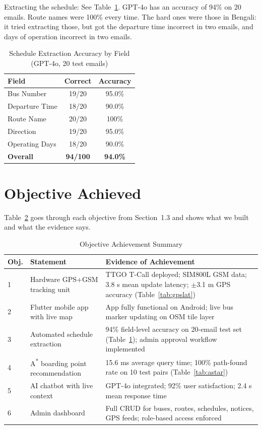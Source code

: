 \documentclass[12pt,a4paper]{report}
\begin{document}
Extracting the schedule: See Table~\ref{tab:extractacc}. GPT-4o has an accuracy of 94\% on 20 emails. Route names were 100\% every time. The hard ones were those in Bengali: it tried extracting those, but got the departure time incorrect in two emails, and days of operation incorrect in two emails.
\begin{table}[t]
\caption{Schedule Extraction Accuracy by Field (GPT-4o, 20 test emails)}
\label{tab:extractacc}
\centering
\begin{tabular}{lcc}
\toprule
\textbf{Field} & \textbf{Correct} & \textbf{Accuracy}\\
\midrule
Bus Number     & 19/20 & 95.0\% \\
Departure Time & 18/20 & 90.0\% \\
Route Name     & 20/20 & 100\%  \\
Direction      & 19/20 & 95.0\% \\
Operating Days & 18/20 & 90.0\% \\
\midrule
\textbf{Overall} & \textbf{94/100} & \textbf{94.0\%} \\
\bottomrule
\end{tabular}
\end{table}

\section{Objective Achieved}

Table~\ref{tab:objectives} goes through each objective from Section~1.3 and shows what we built and what the evidence says.

\begin{table}[t]
\caption{Objective Achievement Summary}
\label{tab:objectives}
\centering
\begin{tabularx}{\linewidth}{lXX}
\toprule
\textbf{Obj.} & \textbf{Statement} & \textbf{Evidence of Achievement}\\
\midrule
1 & Hardware GPS+GSM tracking unit & TTGO T-Call deployed; SIM800L GSM data; 3.8 s mean update latency; $\pm$3.1 m GPS accuracy (Table~\ref{tab:gpslat}) \\
2 & Flutter mobile app with live map & App fully functional on Android; live bus marker updating on OSM tile layer \\
3 & Automated schedule extraction & 94\% field-level accuracy on 20-email test set (Table~\ref{tab:extractacc}); admin approval workflow implemented \\
4 & A\textsuperscript{*} boarding point recommendation & 15.6 ms average query time; 100\% path-found rate on 10 test pairs (Table~\ref{tab:astar}) \\
5 & AI chatbot with live context & GPT-4o integrated; 92\% user satisfaction; 2.4 s mean response time \\
6 & Admin dashboard & Full CRUD for buses, routes, schedules, notices, GPS feeds; role-based access enforced \\
\bottomrule
\end{tabularx}
\end{table}
\end{document}
